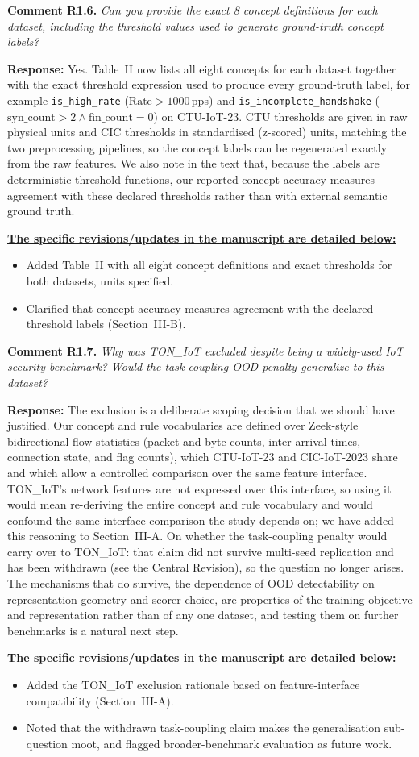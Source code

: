 \documentclass[11pt]{article}
\newcommand{\cmt}[2]{\medskip\noindent\textbf{Comment #1.} \textit{#2}\par}
\newcommand{\resp}{\smallskip\par\noindent\textbf{Response:} }
\newcommand{\revs}{\smallskip\par\noindent\underline{\textbf{The specific revisions/updates in the manuscript are detailed below:}}\par}
\begin{document}
\cmt{R1.6}{Can you provide the exact 8 concept definitions for each dataset,
including the threshold values used to generate ground-truth concept labels?}
\resp Yes. Table~II now lists all eight concepts for each dataset together with
the exact threshold expression used to produce every ground-truth label, for
example \texttt{is\_high\_rate} ($\mathrm{Rate}>1000$\,pps) and
\texttt{is\_incomplete\_handshake} ($\mathrm{syn\_count}>2 \wedge
\mathrm{fin\_count}=0$) on CTU-IoT-23. CTU thresholds are given in raw physical
units and CIC thresholds in standardised (z-scored) units, matching the two
preprocessing pipelines, so the concept labels can be regenerated exactly from the
raw features. We also note in the text that, because the labels are deterministic
threshold functions, our reported concept accuracy measures agreement with these
declared thresholds rather than with external semantic ground truth.
\revs
\begin{itemize}
  \item Added Table~II with all eight concept definitions and exact thresholds for
  both datasets, units specified.
  \item Clarified that concept accuracy measures agreement with the declared
  threshold labels (Section~III-B).
\end{itemize}

\cmt{R1.7}{Why was TON\_IoT excluded despite being a widely-used IoT security
benchmark? Would the task-coupling OOD penalty generalize to this dataset?}
\resp The exclusion is a deliberate scoping decision that we should have justified.
Our concept and rule vocabularies are defined over Zeek-style bidirectional flow
statistics (packet and byte counts, inter-arrival times, connection state, and
flag counts), which CTU-IoT-23 and CIC-IoT-2023 share and which allow a controlled
comparison over the same feature interface. TON\_IoT's network features are not
expressed over this interface, so using it would mean re-deriving the entire
concept and rule vocabulary and would confound the same-interface comparison the
study depends on; we have added this reasoning to Section~III-A. On whether the
task-coupling penalty would carry over to TON\_IoT: that claim did not survive
multi-seed replication and has been withdrawn (see the Central Revision), so the
question no longer arises. The mechanisms that do survive, the dependence of OOD
detectability on representation geometry and scorer choice, are properties of the
training objective and representation rather than of any one dataset, and testing
them on further benchmarks is a natural next step.
\revs
\begin{itemize}
  \item Added the TON\_IoT exclusion rationale based on feature-interface
  compatibility (Section~III-A).
  \item Noted that the withdrawn task-coupling claim makes the generalisation
  sub-question moot, and flagged broader-benchmark evaluation as future work.
\end{itemize}
\end{document}
